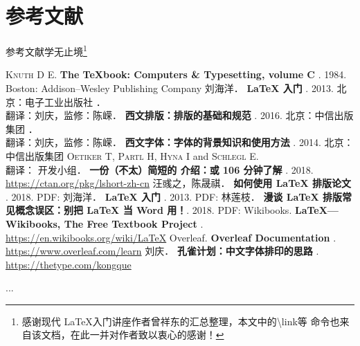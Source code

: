 \documentclass[fontset = none, t]{ctexbeamer}
\begin{document}
\section[参考文献]{参考文献}
\begin{frame}[fragile]{参考文献}{学无止境\footnote[frame,1]{感谢现代
      \LaTeX 入门讲座作者曾祥东的汇总整理，本文中的{\textbackslash link}等
      命令也来自该文档，在此一并对作者致以衷心的感谢！}}
\begin{spacing}{1.3}
\begin{multicols}{2}
\tiny
\newcommand\BOOK[1]{\textbf{#1}}
\newcommand\TAG[1]{\CASE{[#1]}}
\begin{thebibliography}{99}
  \bibitem{}
    \textsc{Knuth D E}.
    \newblock \BOOK{The \TeX book: Computers \& Typesetting, volume C} \TAG{M}. 1984.
    \newblock Boston: Addison--Wesley Publishing Company
  \bibitem{}
    刘海洋．
    \newblock \BOOK{\LaTeX{} 入门} \TAG{M}. 2013.
    \newblock 北京：电子工业出版社
  \bibitem{}
    ．\\
    翻译：刘庆，监修：陈嵘．
    \newblock \BOOK{西文排版：排版的基础和规范} \TAG{M}. 2016.
    \newblock 北京：中信出版集团
  \bibitem{}
    ．\\
    翻译：刘庆，监修：陈嵘．
    \newblock \BOOK{西文字体：字体的背景知识和使用方法} \TAG{M}. 2014.
    \newblock 北京：中信出版集团
  \bibitem{}
    \textsc{Oetiker T}, \textsc{Partl H}, \textsc{Hyna I} and \textsc{Schlegl E}.\\
    翻译：\CTeX{} 开发小组．
    \newblock \BOOK{一份（不太）简短的 \LaTeXe{} 介绍：或 106 分钟了解 \LaTeXe{}} \TAG{EB/OL}. 2018.
    \newblock \url{https://ctan.org/pkg/lshort-zh-cn}
  \bibitem{}
    汪彧之，陈晟祺．
    \newblock \BOOK{如何使用 \LaTeX{} 排版论文} \TAG{EB/OL}. 2018.
    \newblock PDF:
      \href{https://github.com/tuna/thulib-latex-talk/raw/master/latex-talk.pdf}{\faDownload}
  \bibitem{}
    刘海洋．
    \newblock \BOOK{\LaTeX{} 入门} \TAG{EB/OL}. 2013.
    \newblock PDF:
      \href{https://bbs.pku.edu.cn/attach/e7/f2/e7f2bb698b9c3672/tex_intro_talk.pdf}{\faDownload}
  \bibitem{}
    林莲枝．
    \newblock \BOOK{漫谈 \LaTeX{} 排版常见概念误区：别把 \LaTeX{} 当 Word 用！}\TAG{EB/OL}. 2018.
    \newblock PDF:
      \href{http://static.latexstudio.net/wp-content/uploads/2018/03/LianTze-presentation-0320-forReading.pdf}{\faDownload}
  \bibitem{}
    Wikibooks.
    \newblock \BOOK{\LaTeX{}---Wikibooks, The Free Textbook Project} \TAG{EB/OL}.
    \newblock \url{https://en.wikibooks.org/wiki/LaTeX}
  \bibitem{}
    Overleaf.
    \newblock \BOOK{Overleaf Documentation} \TAG{EB/OL}.
    \newblock \url{https://www.overleaf.com/learn}
  \bibitem{}
    刘庆．
    \newblock \BOOK{孔雀计划：中文字体排印的思路} \TAG{EB/OL}.
    \newblock \url{https://thetype.com/kongque}
\end{thebibliography}
\end{multicols}
\end{spacing}
\end{frame}

\begin{frame}
  ...
\end{frame}
\end{document}
